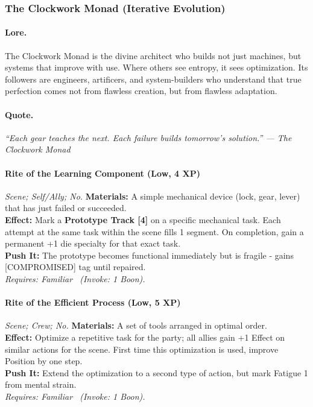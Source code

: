
\subsubsection{The Clockwork Monad (Iterative Evolution)}

\paragraph{Lore.}
The Clockwork Monad is the divine architect who builds not just machines, but systems that improve with use. Where others see entropy, it sees optimization. Its followers are engineers, artificers, and system-builders who understand that true perfection comes not from flawless creation, but from flawless adaptation.

\paragraph{Quote.}
\emph{``Each gear teaches the next. Each failure builds tomorrow's solution.'' — The Clockwork Monad}

\paragraph{Rite of the Learning Component (Low, 4 XP)} \emph{Scene; Self/Ally; No.}
\textbf{Materials:} A simple mechanical device (lock, gear, lever) that has just failed or succeeded. \\
\textbf{Effect:} Mark a \textbf{Prototype Track [4]} on a specific mechanical task. Each attempt at the same task within the scene fills 1 segment. On completion, gain a permanent +1 die specialty for that exact task. \\
\textbf{Push It:} The prototype becomes functional immediately but is fragile - gains [COMPROMISED] tag until repaired. \\
\emph{Requires: Familiar \ (\textit{Invoke:} 1 Boon).}

\paragraph{Rite of the Efficient Process (Low, 5 XP)} \emph{Scene; Crew; No.}
\textbf{Materials:} A set of tools arranged in optimal order. \\
\textbf{Effect:} Optimize a repetitive task for the party; all allies gain +1 Effect on similar actions for the scene. First time this optimization is used, improve Position by one step. \\
\textbf{Push It:} Extend the optimization to a second type of action, but mark Fatigue 1 from mental strain. \\
\emph{Requires: Familiar \ (\textit{Invoke:} 1 Boon).}

